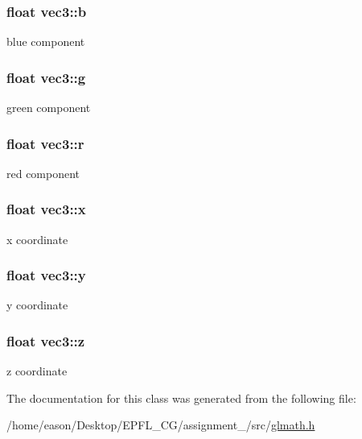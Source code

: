 \subsubsection[{\texorpdfstring{b}{b}}]{\setlength{\rightskip}{0pt plus 5cm}float vec3\+::b}\hypertarget{classvec3_a4153d68b1b7932b554da91c1ee75d77c}{}\label{classvec3_a4153d68b1b7932b554da91c1ee75d77c}


blue component 

\subsubsection[{\texorpdfstring{g}{g}}]{\setlength{\rightskip}{0pt plus 5cm}float vec3\+::g}\hypertarget{classvec3_a4f02b7765f76a7ea7265dcfd802d1eca}{}\label{classvec3_a4f02b7765f76a7ea7265dcfd802d1eca}


green component 

\subsubsection[{\texorpdfstring{r}{r}}]{\setlength{\rightskip}{0pt plus 5cm}float vec3\+::r}\hypertarget{classvec3_aad2a8afd4360cc9fd6689899b5c59fa4}{}\label{classvec3_aad2a8afd4360cc9fd6689899b5c59fa4}


red component 

\subsubsection[{\texorpdfstring{x}{x}}]{\setlength{\rightskip}{0pt plus 5cm}float vec3\+::x}\hypertarget{classvec3_a4ee2cfd5c2698031a47ab7f898d8d47b}{}\label{classvec3_a4ee2cfd5c2698031a47ab7f898d8d47b}


x coordinate 

\subsubsection[{\texorpdfstring{y}{y}}]{\setlength{\rightskip}{0pt plus 5cm}float vec3\+::y}\hypertarget{classvec3_a891379795a14c80936cde4170239a138}{}\label{classvec3_a891379795a14c80936cde4170239a138}


y coordinate 

\subsubsection[{\texorpdfstring{z}{z}}]{\setlength{\rightskip}{0pt plus 5cm}float vec3\+::z}\hypertarget{classvec3_aa76213efcc5d656cc14b71db80a92162}{}\label{classvec3_aa76213efcc5d656cc14b71db80a92162}


z coordinate 



The documentation for this class was generated from the following file\+:\begin{DoxyCompactItemize}
\item 
/home/eason/\+Desktop/\+E\+P\+F\+L\+\_\+\+C\+G/assignment\+\_/src/\hyperlink{glmath_8h}{glmath.\+h}\end{DoxyCompactItemize}
